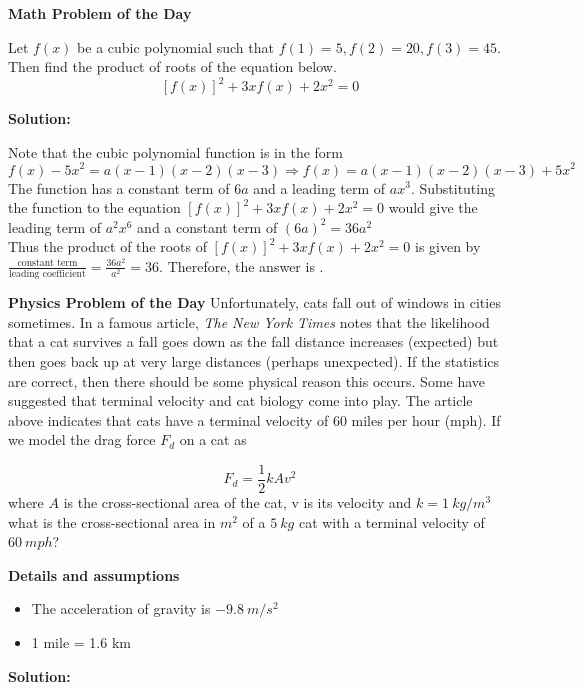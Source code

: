 \documentclass{article}
\begin{document}
	\centering
		\large{\textbf{Math Problem of the Day}}
	\justify

	Let $f(x)$ be a cubic polynomial such that $f(1)=5, f(2)=20, f(3)=45$. Then find the product of roots of the equation below.
	\[ {\left[ f(x) \right]}^2 +3xf(x) +2x^2 = 0 \]
	
	\bigskip
	\noindent
		\textbf{Solution:}
		
	\noindent
	Note that the cubic polynomial function is in the form
	\[ f(x) - 5x^2 = a(x-1)(x-2)(x-3) \Rightarrow f(x) = a(x-1)(x-2)(x-3) +5x^2  \]
	The function has a constant term of $6a$ and a leading term of $ax^3$. Substituting the function to the equation ${\left[ f(x) \right]}^2 +3xf(x) +2x^2 = 0 $ would give the leading term of $a^2x^6$ and a constant term of $(6a)^2 = 36a^2$ \\

	\noindent
	Thus the product of the roots of ${\left[ f(x) \right]}^2 +3xf(x) +2x^2 = 0 $ is given by $ \frac{ \text{constant term}}{ \text{leading coefficient}} = \frac{36a^2}{a^2} = 36$. Therefore, the answer is \fbox{\textcolor{red}{$36$}}.
	
	\bigskip
	\centering
		\large{\textbf{Physics Problem of the Day}}
	\justify
Unfortunately, cats fall out of windows in cities sometimes. In a famous article, \textit{The New York Times} notes that the likelihood that a cat survives a fall goes down as the fall distance increases (expected) but then goes back up at very large distances (perhaps unexpected). If the statistics are correct, then there should be some physical reason this occurs. Some have suggested that terminal velocity and cat biology come into play. The article above indicates that cats have a terminal velocity of 60 miles per hour (mph). If we model the drag force $F_d$ on a cat as

\[ F_d = \frac{1}{2} kAv^2 \]
\noindent
where $A$ is the cross-sectional area of the cat, v is its velocity and $k=1\ kg/m^3$
what is the cross-sectional area in $m^2$ of a $5 \ kg$ cat with a terminal velocity of $60 \ mph$?

\noindent
\textbf{Details and assumptions}
\begin{itemize}
	\item The acceleration of gravity is $-9.8 \  m/s^2$
	\item 1 mile = 1.6 km
\end{itemize}

	\noindent
		\textbf{Solution:}
\end{document}
